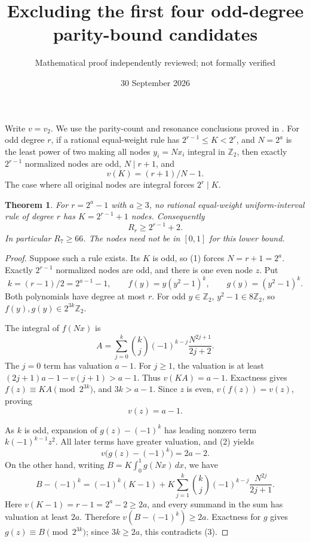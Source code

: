 \documentclass[11pt]{article}
\title{Excluding the first four odd-degree parity-bound candidates}
\author{Mathematical proof independently reviewed; not formally verified}
\date{30 September 2026}
\newtheorem{theorem}{Theorem}
\begin{document}
\maketitle
Write $v=v_2$. We use the parity-count and resonance conclusions proved
in .
For odd degree $r$, if a rational equal-weight rule has
$2^{r-1}\le K<2^r$, and $N=2^a$ is the least power of two making all
nodes $y_i=Nx_i$ integral in $\mathbb Z_2$, then exactly $2^{r-1}$
normalized nodes are odd, $N\mid r+1$, and
\[
 v(K)=(r+1)/N-1.\tag{1}
\]
The case where all original nodes are integral forces $2^r\mid K$.

\begin{theorem}
For $r=2^a-1$ with $a\ge3$, no rational equal-weight uniform-interval
rule of degree $r$ has $K=2^{r-1}+1$ nodes. Consequently
\[
 R_r\ge2^{r-1}+2.
\]
In particular $R_7\ge66$.
The nodes need not be in $[0,1]$ for this lower bound.
\end{theorem}
\begin{proof}
Suppose such a rule exists. Its $K$ is odd, so (1) forces
$N=r+1=2^a$. Exactly $2^{r-1}$ normalized nodes are odd, and there is
one even node $z$. Put
\[
 k=(r-1)/2=2^{a-1}-1,\qquad
 f(y)=y(y^2-1)^k,\qquad g(y)=(y^2-1)^k.
\]
Both polynomials have degree at most $r$. For odd $y\in\mathbb Z_2$,
$y^2-1\in8\mathbb Z_2$, so $f(y),g(y)\in2^{3k}\mathbb Z_2$.

The integral of $f(Nx)$ is
\[
 A=\sum_{j=0}^k {k\choose j}(-1)^{k-j}
           \frac{N^{2j+1}}{2j+2}.
\]
The $j=0$ term has valuation $a-1$. For $j\ge1$, the valuation is
at least $(2j+1)a-1-v(j+1)>a-1$. Thus $v(KA)=a-1$.
Exactness gives $f(z)\equiv KA\pmod{2^{3k}}$, and $3k>a-1$.
Since $z$ is even, $v(f(z))=v(z)$, proving
\[
 v(z)=a-1.\tag{2}
\]

As $k$ is odd, expansion of $g(z)-(-1)^k$ has leading nonzero term
$k(-1)^{k-1}z^2$. All later terms have greater valuation, and (2) yields
\[
 v\bigl(g(z)-(-1)^k\bigr)=2a-2.\tag{3}
\]
On the other hand, writing $B=K\int_0^1g(Nx)\,dx$, we have
\[
 B-(-1)^k=(-1)^k(K-1)
  +K\sum_{j=1}^k {k\choose j}(-1)^{k-j}
            \frac{N^{2j}}{2j+1}.
\]
Here $v(K-1)=r-1=2^a-2\ge2a$, and every summand in the sum has
valuation at least $2a$. Therefore $v(B-(-1)^k)\ge2a$.
Exactness for $g$ gives $g(z)\equiv B\pmod{2^{3k}}$; since
$3k\ge2a$, this contradicts (3).
\end{proof}
\end{document}
